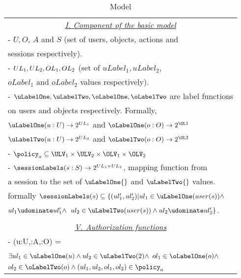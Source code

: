 \begin{table}
	\centering
	\caption{ \labacZeroTwoTwo{} Model} %
	\label{tab:labac022-definition}
	\begin{tabular}{|l|}						
		\hline					
		\multicolumn{1}{|c|}{\underline{\textit{I. Component of the basic model }}}\\			
		- $U, O$, $A$ and $S$ (set of users, objects, actions and \\ \hfill sessions respectively).  \\
		- $UL_1, UL_2, OL_1, OL_2$ (set of $uLabel_1, uLabel_2,$ \\ \hfill $oLabel_1$ and $oLabel_2$ values respectively). \\
		- $\uLabelOne, \uLabelTwo, \oLabelOne, \oLabelTwo$ are label functions \\ \hfill on users and objects respectively. Formally, \\ \hfill  $\uLabelOne(u:U) \to 2^{\ULOne}$ and $\oLabelOne(o:O) \to 2^{\OL1}$ \\ \hfill  $\uLabelTwo(u:U) \to 2^{\ULTwo}$ and $\oLabelTwo(o:O) \to 2^{\OL2}$ \\  
		-  $\policy_a \subseteq \ULV_1 \times \ULV_2 \times \OLV_1 \times \OLV_2$ \\
	 
		 - $\sessionLabels(s:S) \to 2^{UL_1 \times UL_2}$, mapping function from \\ \hfill a session   to the set  of $\uLabelOne{}$ and $\uLabelTwo{}$ values.    \\ \hfill formally	$\sessionLabels(s) \subseteq \{(ul_1', ul_2') | ul_1 \in \uLabelOne(user(s)) \land$ \\ \hfill $ul_1  \udominate ul_1' \land$   $ul_2 \in \uLabelTwo(user(s)) \land ul_2  \udominate ul_2' \}$.		\\ \\
		
		\multicolumn{1}{|c|}{\underline{\textit{V. Authorization functions}}} \\
		- \request(u:U,\amem:A,\objmem:O) =	 \\ \hfill
		$\exists ul_1 \in \uLabelOne(u) \land ul_2 \in \uLabelTwo(2) \land$ $ ol_1 \in \oLabelOne(o) \land$ \\ \hfill  $ ol_2 \in \oLabelTwo(o) \land  (ul_1, ul_2,ol_1, ol_2) \in \policy_a   $  

		\\ \hline	
	\end{tabular}
	
\end{table}


